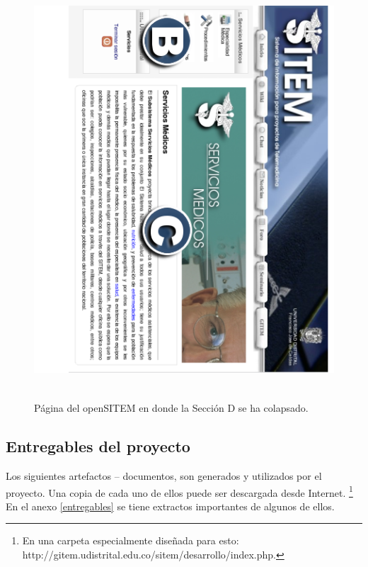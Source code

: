 \begin{figure}
 \centering
 \includegraphics[width=156mm, height=156mm]{seccion_colapsada.png}
 \caption{Página del openSITEM en donde la Sección D se ha colapsado.}
 \label{seccion_colapsada}
\end{figure}

\subsection{Entregables del proyecto}

Los siguientes artefactos – documentos, son generados y utilizados por el proyecto. Una copia de cada uno de ellos puede ser descargada desde Internet. \footnote{En una carpeta especialmente diseñada para esto: http://gitem.udistrital.edu.co/sitem/desarrollo/index.php.} En el anexo \ref{entregables} se tiene extractos importantes de algunos de ellos.

